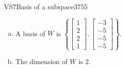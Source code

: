 \begin{exercise}{VS7}{Basis of a subspace}{3755}
\begin{exerciseAnswer}
 

\begin{enumerate}[(a)]
\item 

A basis of \(W\) is \(\left\{ \left[\begin{array}{c}
1 \\
2 \\
2 \\
1
\end{array}\right] , \left[\begin{array}{c}
-3 \\
-5 \\
-5 \\
-5
\end{array}\right] \right\}\).


\item 

The dimension of \(W\) is \(2\).


\end{enumerate}

     \end{exerciseAnswer}
 \end{exercise}



